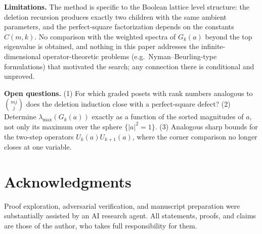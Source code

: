 \documentclass[11pt]{article}
\theoremstyle{remark}
\begin{document}
\textbf{Limitations.} The method is specific to the Boolean lattice level
structure: the deletion recursion produces exactly two children with the
same ambient parameters, and the perfect-square factorization depends on
the constants $C(m,k)$. No comparison with the weighted spectra of
$G_k(a)$ beyond the top eigenvalue is obtained, and nothing in this paper
addresses the infinite-dimensional operator-theoretic problems
(e.g.\ Nyman--Beurling-type formulations) that motivated the search; any
connection there is conditional and unproved.

\textbf{Open questions.} (1) For which graded posets with rank numbers
analogous to $\binom{mj}{j}$ does the deletion induction close with a
perfect-square defect? (2) Determine $\lambda_{\max}(G_k(a))$ exactly as a
function of the sorted magnitudes of $a$, not only its maximum over the
sphere $\{|a|^2=1\}$. (3) Analogous sharp bounds for the two-step
operators $U_k(a)U_{k+1}(a)$, where the corner comparison no longer
closes at one variable.

\section*{Acknowledgments}
Proof exploration, adversarial verification, and manuscript preparation were
substantially assisted by an AI research agent. All statements, proofs, and
claims are those of the author, who takes full responsibility for them.
\end{document}
